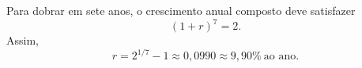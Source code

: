Para dobrar em sete anos, o crescimento anual composto deve satisfazer
\[
(1+r)^{7}=2.
\]
Assim,
\[
r=2^{1/7}-1\approx0{,}0990\approx9{,}90\%\ \text{ao ano}.
\]